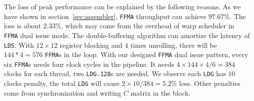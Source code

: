The loss of peak performance can be explained by the following reasons. As we have shown in 
section~\ref{sec:assembler}, {\tt FFMA} throughput can achieve $97.67\%$. 
The loss is about $2.33\%$, which may come 
from the overhead of warp scheduler in {\tt FFMA} dual issue mode. The double-buffering algorithm can amortize the latency 
of {\tt LDS}.
With $12\times12$ register blocking and $4$ times unrolling, there will be $144*4=576$ {\tt FFMA}s in the loop.
With our designed {\tt FFMA} dual issue pattern, every six {\tt FFMA}s needs four clock cycles in the pipeline.
It needs $4\times144\times4/6=384$ clocks for each thread, two {\tt LDG.128}s are needed.
We observe each {\tt LDG} has $10$ clocks penalty, the total {\tt LDG} will cause $2\times10/384 = 5.2\%$ loss. Other
penalties come from synchronization and writing $C$ matrix in the block.

